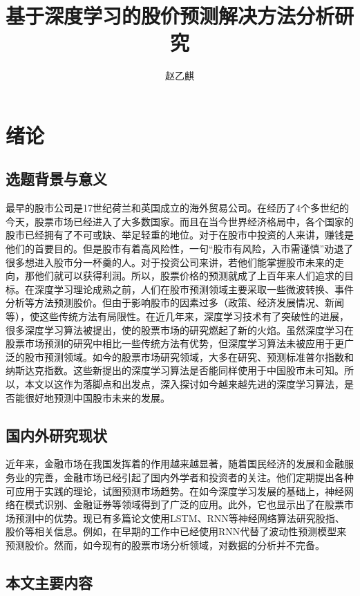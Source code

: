 \documentclass[UTF8]{ctexart}
\author{赵乙麒}
\title{基于深度学习的股价预测解决方法分析研究}
\begin{document}
\maketitle
\section{绪论}
\subsection{选题背景与意义}
最早的股市公司是17世纪荷兰和英国成立的海外贸易公司。在经历了4个多世纪的今天，股票市场已经进入了大多数国家。而且在当今世界经济格局中，各个国家的股市已经拥有了不可或缺、举足轻重的地位。对于在股市中投资的人来讲，赚钱是他们的首要目的。但是股市有着高风险性，一句“股市有风险，入市需谨慎”劝退了很多想进入股市分一杯羹的人。对于投资公司来讲，若他们能掌握股市未来的走向，那他们就可以获得利润。所以，股票价格的预测就成了上百年来人们追求的目标。在深度学习理论成熟之前，人们在股市预测领域主要采取一些微波转换\cite{Ramsey1999}、事件分析\cite{Verma2017}等方法预测股价。但由于影响股市的因素过多（政策、经济发展情况、新闻等），使这些传统方法有局限性。在近几年来，深度学习技术有了突破性的进展\cite{LeCun2015,Schmidhuber2015}，很多深度学习算法被提出，使的股票市场的研究燃起了新的火焰。虽然深度学习在股票市场预测的研究中相比一些传统方法有优势，但深度学习算法未被应用于更广泛的股市预测领域。如今的股票市场研究领域，大多在研究、预测标准普尔指数和纳斯达克指数。这些新提出的深度学习算法是否能同样使用于中国股市未可知。所以，本文以这作为落脚点和出发点，深入探讨如今越来越先进的深度学习算法，是否能很好地预测中国股市未来的发展。
\subsection{国内外研究现状}
近年来，金融市场在我国发挥着的作用越来越显著，随着国民经济的发展和金融服务业的完善，金融市场已经引起了国内外学者和投资者的关注。他们定期提出各种可应用于实践的理论，试图预测市场趋势\cite{Lahmiri2015,Chiang2015,Seddon2017,Zhou2016,Ichinose2018}。在如今深度学习发展的基础上\cite{Gers2002,Hinton2006,Jiang2018,Kim2015,Kuremoto2014,Torres2017}，神经网络在模式识别、金融证券等领域得到了广泛的应用。此外，它也显示出了在股票市场预测中的优势。现已有多篇论文使用LSTM、RNN等神经网络算法研究股指、股价等相关信息\cite{Pang2018,Chong2017,Bao2017,Chen2015,Fischer2018,Hsieh2011,Huynh2017,Liu2017}。例如，在早期的工作中\cite{Kamijo1990}已经使用RNN代替了波动性预测模型来预测股价。然而，如今现有的股票市场分析领域，对数据的分析并不完备。
\subsection{本文主要内容}
\end{document}
